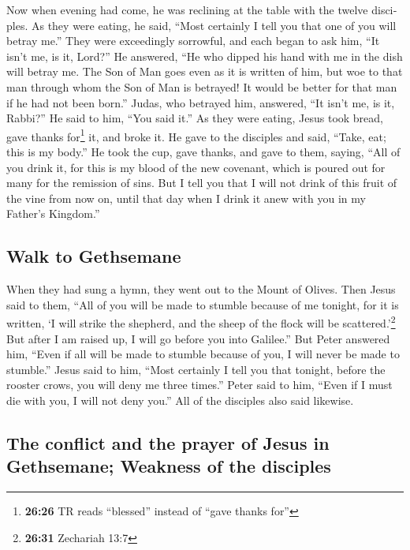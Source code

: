 \begin{paracol}{2}
\begin{otherlanguage}{english}
 Now when evening had come, he was reclining at the table
with the twelve disciples.  As they were eating, he said,
``Most certainly I tell you that one of you will betray me.''
 They were exceedingly sorrowful, and each began to ask
him, ``It isn't me, is it, Lord?''  He answered, ``He who
dipped his hand with me in the dish will betray me.  The
Son of Man goes even as it is written of him, but woe to that man
through whom the Son of Man is betrayed! It would be better for that man
if he had not been born.''  Judas, who betrayed him,
answered, ``It isn't me, is it, Rabbi?'' He said to him, ``You said
it.''  As they were eating, Jesus took bread, gave thanks
for\footnote{\textbf{26:26} TR reads ``blessed'' instead of ``gave
  thanks for''} it, and broke it. He gave to the disciples and said,
``Take, eat; this is my body.''  He took the cup, gave
thanks, and gave to them, saying, ``All of you drink it, 
for this is my blood of the new covenant, which is poured out for many
for the remission of sins.  But I tell you that I will
not drink of this fruit of the vine from now on, until that day when I
drink it anew with you in my Father's Kingdom.''

\hypertarget{walk-to-gethsemane}{%
\subsection{Walk to Gethsemane}\label{walk-to-gethsemane}}

 When they had sung a hymn, they went out to the Mount of
Olives.  Then Jesus said to them, ``All of you will be
made to stumble because of me tonight, for it is written, `I will strike
the shepherd, and the sheep of the flock will be scattered.'\footnote{\textbf{26:31}
  Zechariah 13:7}  But after I am raised up, I will go
before you into Galilee.''  But Peter answered him,
``Even if all will be made to stumble because of you, I will never be
made to stumble.''  Jesus said to him, ``Most certainly I
tell you that tonight, before the rooster crows, you will deny me three
times.''  Peter said to him, ``Even if I must die with
you, I will not deny you.'' All of the disciples also said likewise.

\hypertarget{the-conflict-and-the-prayer-of-jesus-in-gethsemane-weakness-of-the-disciples}{%
\subsection{The conflict and the prayer of Jesus in Gethsemane; Weakness
of the
disciples}\label{the-conflict-and-the-prayer-of-jesus-in-gethsemane-weakness-of-the-disciples}}


\end{otherlanguage}
\end{paracol}
